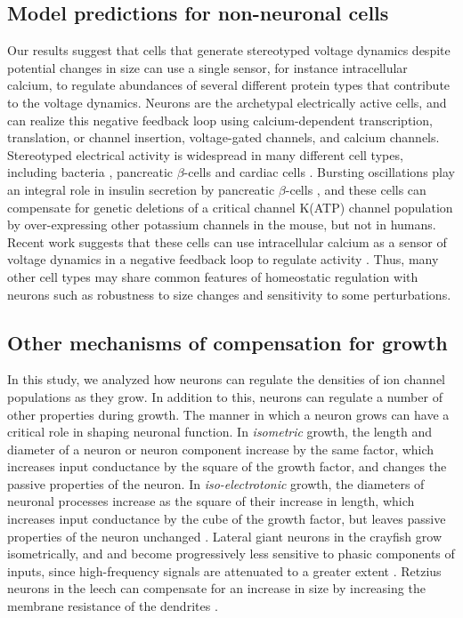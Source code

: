 \documentclass[9pt,lineno]{elife}
\begin{document}
\subsection{Model predictions for non-neuronal cells}

Our results suggest that cells that generate stereotyped voltage dynamics despite potential changes in size can use a single sensor, for instance intracellular calcium, to regulate abundances of several different protein types that contribute to the voltage dynamics. Neurons are the archetypal electrically active cells, and can realize this negative feedback loop using calcium-dependent transcription, translation, or channel insertion, voltage-gated channels, and calcium channels. Stereotyped electrical activity is widespread in many different cell types, including bacteria \citep{Masi:2015iy, Kralj:2011ke}, pancreatic $\beta$-cells \citep{Bertram:2010ff} and cardiac cells \citep{Hund:2000kz}. Bursting oscillations play an integral role in insulin secretion by pancreatic $\beta$-cells  \citep{Bertram:2010ff}, and these cells can compensate for genetic deletions of a critical channel K(ATP) channel population by over-expressing other potassium channels \citep{Yildirim:2017kj} in the mouse, but not in humans. Recent work suggests that these cells can use intracellular calcium as a sensor of voltage dynamics in a negative feedback loop to regulate activity \citep{Yildirim:2017fq}. Thus, many other cell types may share common features of homeostatic regulation with neurons such as robustness to size changes and sensitivity to some perturbations.  

\subsection{Other mechanisms of compensation for growth}

In this study, we analyzed how neurons can regulate the densities of ion channel populations as they grow. In addition to this, neurons can regulate a number of other properties during growth. The manner in which a neuron grows can have a critical role in shaping neuronal function. In \emph{isometric} growth, the length and diameter of a neuron or neuron component increase by the same factor, which increases input conductance by the square of the growth factor, and changes the passive properties of the neuron. In \emph{iso-electrotonic} growth, the diameters of neuronal processes increase as the square of their increase in length, which increases input conductance by the cube of the growth factor, but leaves passive properties of the neuron unchanged \citep{Olsen:1996im}. Lateral giant neurons in the crayfish grow isometrically, and and become progressively less sensitive to phasic components of inputs, since high-frequency signals are attenuated to a greater extent \citep{Edwards:omEiAjTW, Edwards:OcB8a57D}. Retzius neurons in the leech can compensate for an increase in size by increasing the membrane resistance of the dendrites \citep{DeLaRosaTovar:2016ed}.
\end{document}
